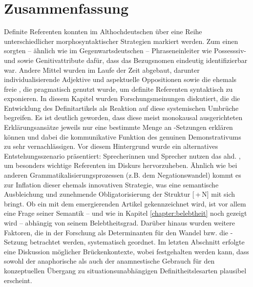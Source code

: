 \section{Zusammenfassung}
Definite Referenten konnten im Althochdeutschen über eine Reihe unterschiedlicher morphosyntaktischer Strategien markiert werden. Zum einen sorgten -- ähnlich wie im Gegenwartsdeutschen -- Phraseneinleiter wie Possesssiv-  und  sowie Genitivattribute  dafür, dass das Bezugsnomen eindeutig identifizierbar war. Andere Mittel wurden im Laufe der Zeit abgebaut, darunter individualisierende Adjektive  und aspektuelle  Oppositionen sowie die ehemals freie , die pragmatisch genutzt wurde, um definite Referenten syntaktisch zu exponieren. In diesem Kapitel wurden Forschungsmeinungen diskutiert, die die Entwicklung des Definitartikels  als Reaktion auf diese systemischen Umbrüche begreifen. Es ist deutlich geworden, dass diese meist monokausal ausgerichteten Erklärungsansätze jeweils nur eine bestimmte Menge an -Setzungen erklären können und dabei die kommunikative Funktion des genuinen Demonstrativums  zu sehr vernachlässigen. Vor diesem Hintergrund wurde ein alternatives Entstehungsszenario präsentiert: Sprecherinnen und Sprecher nutzen das ahd. , um besonders wichtige Referenten im Diskurs hervorzuheben. Ähnlich wie bei anderen Grammatikalisierungsprozessen  (z.B. dem Negationswandel) kommt es zur Inflation dieser ehemals innovativen Strategie, was eine semantische Ausbleichung und zunehmende Obligatorisierung der Struktur [\,+\,N] mit sich bringt. Ob ein  mit dem emergierenden Artikel gekennzeichnet wird, ist vor allem eine Frage seiner Semantik -- und wie in Kapitel \ref{chapter:belebtheit} noch gezeigt wird -- abhängig von seinem  Belebtheitsgrad. Darüber hinaus wurden weitere Faktoren, die in der Forschung als Determinanten für den Wandel bzw. die -Setzung betrachtet werden, systematisch geordnet. Im letzten Abschnitt erfolgte eine Diskussion möglicher  Brückenkontexte, wobei festgehalten werden kann, dass sowohl der anaphorische  als auch der anamnestische  Gebrauch für den konzeptuellen Übergang zu situationsunabhängigen Definitheitslesarten plausibel erscheint. 
